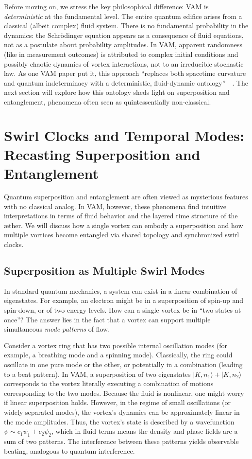 \documentclass[preprint]{revtex4-2}
\begin{document}
    Before moving on, we stress the key philosophical difference: VAM is \emph{deterministic} at the fundamental level. The entire quantum edifice arises from a classical (albeit complex) fluid system. There is no fundamental probability in the dynamics: the Schrödinger equation appears as a consequence of fluid equations, not as a postulate about probability amplitudes. In VAM, apparent randomness (like in measurement outcomes) is attributed to complex initial conditions and possibly chaotic dynamics of vortex interactions, not to an irreducible stochastic law. As one VAM paper put it, this approach “replaces both spacetime curvature and quantum indeterminacy with a deterministic, fluid-dynamic ontology”~\cite{reference_94}~\cite{reference_95}. The next section will explore how this ontology sheds light on superposition and entanglement, phenomena often seen as quintessentially non-classical.

\section{Swirl Clocks and Temporal Modes: Recasting Superposition and Entanglement}
    Quantum superposition and entanglement are often viewed as mysterious features with no classical analog. In VAM, however, these phenomena find intuitive interpretations in terms of fluid behavior and the layered time structure of the æther. We will discuss how a single vortex can embody a superposition and how multiple vortices become entangled via shared topology and synchronized swirl clocks.

    \subsection{Superposition as Multiple Swirl Modes}
    In standard quantum mechanics, a system can exist in a linear combination of eigenstates. For example, an electron might be in a superposition of spin-up and spin-down, or of two energy levels. How can a single vortex be in “two states at once”? The answer lies in the fact that a vortex can support multiple simultaneous \emph{mode patterns} of flow.

    Consider a vortex ring that has two possible internal oscillation modes (for example, a breathing mode and a spinning mode). Classically, the ring could oscillate in one pure mode or the other, or potentially in a combination (leading to a beat pattern). In VAM, a superposition of two eigenstates $|K, n_1\rangle + |K, n_2\rangle$ corresponds to the vortex literally executing a combination of motions corresponding to the two modes. Because the fluid is nonlinear, one might worry if linear superposition holds. However, in the regime of small oscillations (or widely separated modes), the vortex’s dynamics can be approximately linear in the mode amplitudes. Thus, the vortex’s state is described by a wavefunction $\psi \sim c_1 \psi_1 + c_2 \psi_2$, which in fluid terms means the density and phase fields are a sum of two patterns. The interference between these patterns yields observable beating, analogous to quantum interference.
\end{document}
